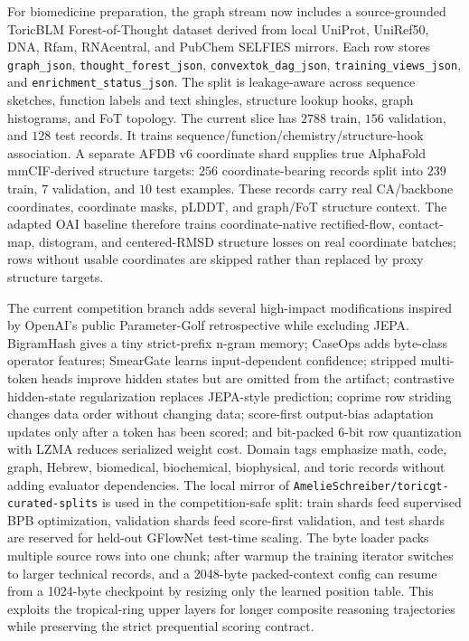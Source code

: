 \documentclass[10pt]{article}
\theoremstyle{definition}
\theoremstyle{plain}
\theoremstyle{remark}
\begin{document}
For biomedicine preparation, the graph stream now includes a source-grounded
ToricBLM Forest-of-Thought dataset derived from local UniProt, UniRef50, DNA,
Rfam, RNAcentral, and PubChem SELFIES mirrors.  Each row stores
\texttt{graph\_json}, \texttt{thought\_forest\_json}, \texttt{convextok\_dag\_json},
\texttt{training\_views\_json}, and \texttt{enrichment\_status\_json}.  The
split is leakage-aware across sequence sketches, function labels and text
shingles, structure lookup hooks, graph histograms, and FoT topology.  The
current slice has $2788$ train, $156$ validation, and $128$ test records.  It
trains sequence/function/chemistry/structure-hook association.  A separate
AFDB v6 coordinate shard supplies true AlphaFold mmCIF-derived structure
targets: $256$ coordinate-bearing records split into $239$ train, $7$
validation, and $10$ test examples.  These records carry real CA/backbone
coordinates, coordinate masks, pLDDT, and graph/FoT structure context.  The
adapted OAI baseline therefore trains coordinate-native rectified-flow,
contact-map, distogram, and centered-RMSD structure losses on real coordinate
batches; rows without usable coordinates are skipped rather than replaced by
proxy structure targets.

The current competition branch adds several high-impact modifications inspired by OpenAI's public Parameter-Golf retrospective while excluding JEPA.  BigramHash gives a tiny strict-prefix n-gram memory; CaseOps adds byte-class operator features; SmearGate learns input-dependent confidence; stripped multi-token heads improve hidden states but are omitted from the artifact; contrastive hidden-state regularization replaces JEPA-style prediction; coprime row striding changes data order without changing data; score-first output-bias adaptation updates only after a token has been scored; and bit-packed 6-bit row quantization with LZMA reduces serialized weight cost.  Domain tags emphasize math, code, graph, Hebrew, biomedical, biochemical, biophysical, and toric records without adding evaluator dependencies.  The local mirror of \texttt{AmelieSchreiber/toricgt-curated-splits} is used in the competition-safe split: train shards feed supervised BPB optimization, validation shards feed score-first validation, and test shards are reserved for held-out GFlowNet test-time scaling.  The byte loader packs multiple source rows into one chunk; after warmup the training iterator switches to larger technical records, and a 2048-byte packed-context config can resume from a 1024-byte checkpoint by resizing only the learned position table.  This exploits the tropical-ring upper layers for longer composite reasoning trajectories while preserving the strict prequential scoring contract.
\end{document}
